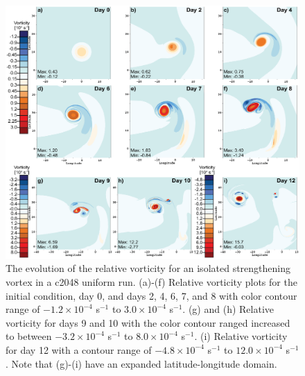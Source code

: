 \documentclass{ametsoc}
\begin{document}
%
\begin{figure}
    \centerline{%
    \noindent
    \includegraphics[width=\textwidth]{Figures/c2048_vort_intime-01.eps}}
   \caption{The evolution of the relative vorticity for an isolated strengthening vortex in a c2048 uniform run.
   (a)-(f) Relative vorticity plots for the initial condition, day 0, and days 2, 4, 6, 7, and 8 with color contour
   range of $-1.2 \times 10^{-4}$ s$^{-1}$ to $3.0 \times 10^{-4}$ s$^{-1}$. (g) and (h) Relative 
   vorticity for days 9 and 10 with the color contour ranged increased to between 
   $-3.2 \times 10^{-4}$ s$^{-1}$ to $8.0 \times 10^{-4}$ s$^{-1}$. (i) Relative vorticity for
   day 12 with a contour range of $-4.8 \times 10^{-4}$ s$^{-1}$ to $12.0 \times 10^{-4}$ s$^{-1}$.
   Note that (g)-(i) have an expanded latitude-longitude domain.}%
    \label{fig:c2048_vortseries}
\end{figure}
\end{document}
